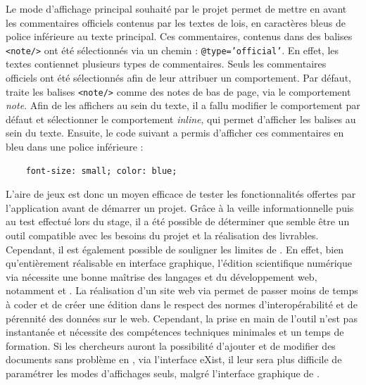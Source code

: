 Le mode d'affichage principal souhaité par le projet permet de mettre en avant les commentaires officiels contenus par les textes de lois, en caractères bleus de police inférieure au texte principal. Ces commentaires, contenus dans des balises \texttt{<note/>} ont été sélectionnés via un chemin \xpath : \texttt{@type='official'}. En effet, les textes contiennet plusieurs types de commentaires. Seuls les commentaires officiels ont été sélectionnés afin de leur attribuer un comportement. Par défaut, \tp traite les balises \texttt{<note/>} comme des notes de bas de page, via le comportement \textit{note}. Afin de les affichers au sein du texte, il a fallu modifier le comportement par défaut et sélectionner le comportement \textit{inline}, qui permet d'afficher les balises au sein du texte. Ensuite, le code \CSS suivant a permis d'afficher ces commentaires en bleu dans une police inférieure : 

\begin{verbatim}
    font-size: small; color: blue;
\end{verbatim}

L'aire de jeux \tp est donc un moyen efficace de tester les fonctionnalités offertes par l'application avant de démarrer un projet. Grâce à la veille informationnelle puis au test effectué lors du stage, il a été possible de déterminer que \tp semble être un outil compatible avec les besoins du projet et la réalisation des livrables. Cependant, il est également possible de souligner les limites de \tp. En effet, bien qu'entièrement réalisable en interface graphique, l'édition scientifique numérique via \tp nécessite une bonne maîtrise des langages \XML et du développement web, notamment \HTML et \CSS. La réalisation d'un site web via \tp permet de passer moins de temps à coder et de créer une édition dans le respect des normes d'interopérabilité et de pérennité des données sur le web. Cependant, la prise en main de l'outil n'est pas instantanée et nécessite des compétences techniques minimales et un temps de formation. Si les chercheurs auront la possibilité d'ajouter et de modifier des documents sans problème en \XML, via l'interface eXist, il leur sera plus difficile de paramétrer les modes d'affichages seuls, malgré l'interface graphique de \tp. 

